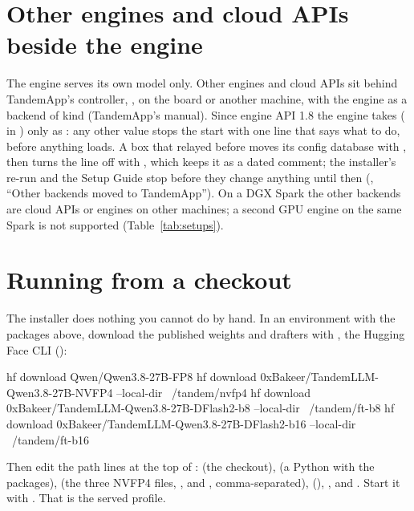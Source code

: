 \section{Other engines and cloud APIs beside the engine}\label{sec:engine-backends}

The engine serves its own model only. Other engines and cloud APIs sit behind TandemApp's controller, , on the board or another machine, with the engine as a backend of kind  (TandemApp's manual). Since engine API 1.8 the engine takes  ( in ) only as : any other value stops the start with one line that says what to do, before anything loads. A box that relayed before moves its config database with , then turns the line off with , which keeps it as a dated comment; the installer's re-run and the Setup Guide stop before they change anything until then (, \enquote{Other backends moved to TandemApp}). On a DGX Spark the other backends are cloud APIs or engines on other machines; a second GPU engine on the same Spark is not supported (Table~\ref{tab:setups}).

\section{Running from a checkout}

The installer does nothing you cannot do by hand. In an environment with the packages above, download the published weights and drafters with , the Hugging Face CLI ():

\begin{shell}
hf download Qwen/Qwen3.8-27B-FP8
hf download 0xBakeer/TandemLLM-Qwen3.8-27B-NVFP4 --local-dir ~/tandem/nvfp4
hf download 0xBakeer/TandemLLM-Qwen3.8-27B-DFlash2-b8 --local-dir ~/tandem/ft-b8
hf download 0xBakeer/TandemLLM-Qwen3.8-27B-DFlash2-b16 --local-dir ~/tandem/ft-b16
\end{shell}

Then edit the path lines at the top of :  (the checkout),  (a Python with the packages),  (the three NVFP4 files, ,  and , comma-separated),  (), ,  and . Start it with . That is the served profile.

